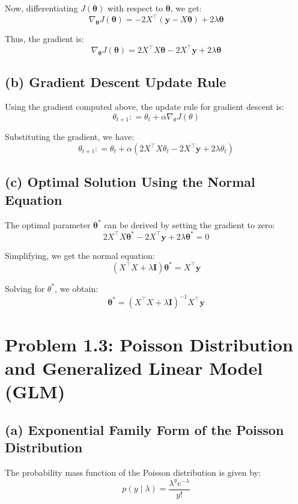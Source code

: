 \documentclass[12pt]{article}
\begin{document}
Now, differentiating \( J(\boldsymbol\theta) \) with respect to \( \boldsymbol\theta \), we get:
\[
\nabla_{\boldsymbol\theta} J(\boldsymbol\theta) = -2X^\top(\boldsymbol y - X \boldsymbol\theta) + 2\lambda\boldsymbol\theta
\]

Thus, the gradient is:
\[
\nabla_{\boldsymbol\theta} J(\boldsymbol\theta) = 2X^\top X \boldsymbol\theta - 2X^\top \boldsymbol y + 2\lambda \boldsymbol\theta
\]

\subsection*{(b) Gradient Descent Update Rule}

Using the gradient computed above, the update rule for gradient descent is:
\[
\theta_{t+1} \colon= \theta_{t} + \alpha \nabla_\theta J(\theta)
\]

Substituting the gradient, we have:
\[
    \theta_{t+1} \colon= \theta_{t} + \alpha \left( 2X^\top X \theta_t - 2X^\top \boldsymbol y + 2\lambda \theta_t \right)
\]

\subsection*{(c) Optimal Solution Using the Normal Equation}

The optimal parameter \( \boldsymbol\theta^* \) can be derived by setting the gradient to zero:
\[
2X^\top X \boldsymbol\theta^* - 2X^\top \boldsymbol y + 2\lambda \boldsymbol\theta^* = 0
\]

Simplifying, we get the normal equation:
\[
(X^\top X +\lambda \boldsymbol I)\boldsymbol\theta^* = X^\top \boldsymbol y
\]

Solving for \( \theta^* \), we obtain:
\[
    \boldsymbol\theta^* = (X^\top X + \lambda \boldsymbol I)^{-1} X^\top \boldsymbol y
\]

\newpage

\section*{Problem 1.3: Poisson Distribution and Generalized Linear Model (GLM)}

\subsection*{(a) Exponential Family Form of the Poisson Distribution}

The probability mass function of the Poisson distribution is given by:
\[
p(y \mid \lambda) = \frac{\lambda^y e^{-\lambda}}{y!}
\]
\end{document}
